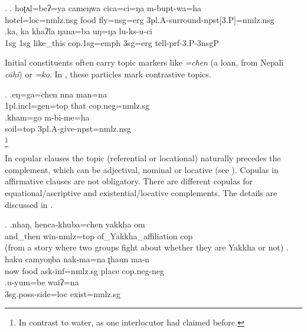 \ex. \ag.   hoʈʌl=beʔ=ya          cameŋwa  cica=ci=ŋa      m-bupt-wa=ha\\
hotel{\sc =loc=nmlz.nsg} food fly{\sc =nsg=erg} {\sc 3pl.A-}surround{\sc -npst[3.P]=nmlz.nsg}\\
 
\bg.ka,  ka  khaʔla   ŋana=ba                uŋ=ŋa   lu-ks-u-ci\\
{\sc 1sg} {\sc 1sg} like\_this {\sc cop.1sg=emph} {\sc 3sg=erg} tell{\sc -prf-3.P-3nsgP}\\
 
 
 Initial constituents often carry topic markers  like \emph{=chen} (a  loan, from Nepali \emph{cāhĩ}) or \emph{=ko}. In \Next, these particles mark  contrastive topics.
 
 \ex. \ag.eŋ=ga=chen                nna  man=na\\
 {\sc 1pl.incl=gen=top} that  {\sc cop.neg=nmlz.sg}\\
   
 \bg.kham=go     m-bi-me=ha\\
 soil{\sc =top} {\sc 3pl.A-}give{\sc -npst=nmlz.nsg}\\
 \footnote{In contrast to water, as one interlocutor had claimed before.}
 
 In copular clauses the topic (referential or locational) naturally precedes the complement, which can be adjectival, nominal or locative (see \Next). Copulas in affirmative clauses are not obligatory. There are different copulas for equational/ascriptive  and existential/locative complements. The details are discussed in . 
 
 \ex. \ag.nhaŋ,    henca-khuba=chen  yakkha          om\\
 and\_then win{\sc -nmlz=top} of\_Yakkha\_affiliation {\sc cop}\\
  (from a story where two groups fight about whether they are Yakkha or not) 
   	\bg.  haku        camyoŋba  nak-ma=na               ʈhaun ma-n\\
		now food ask{\sc -inf=nmlz.sg} place {\sc cop.neg-neg}\\
	 
	\bg.u-yum=be waiʔ=na\\
	{\sc 3sg.poss-}side{\sc =loc} exist{\sc [3]=nmlz.sg}\\
	
